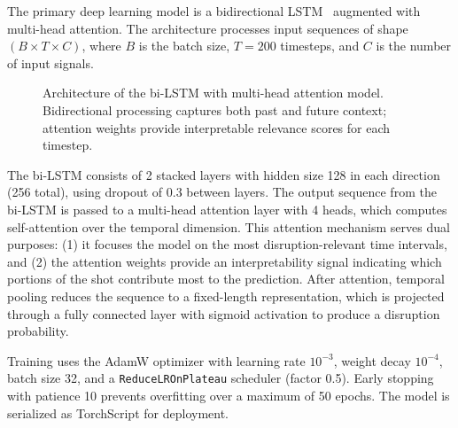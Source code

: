 \documentclass[twocolumn]{article}
\begin{document}
The primary deep learning model is a bidirectional
LSTM~\citep{hochreiter1997} augmented with multi-head
attention.
The architecture processes input sequences of shape
$(B \times T \times C)$, where $B$ is the batch size,
$T = 200$ timesteps, and $C$ is the number of input signals.

\begin{figure}[t]
\centering
{}
\caption{Architecture of the bi-LSTM with multi-head attention
  model. Bidirectional processing captures both past and future
  context; attention weights provide interpretable relevance
  scores for each timestep.}
\label{fig:lstm}
\end{figure}

The bi-LSTM consists of 2 stacked layers with hidden size 128
in each direction (256 total), using dropout of 0.3 between
layers.
The output sequence from the bi-LSTM is passed to a multi-head
attention layer with 4 heads, which computes self-attention
over the temporal dimension.
This attention mechanism serves dual purposes: (1) it focuses
the model on the most disruption-relevant time intervals, and
(2) the attention weights provide an interpretability signal
indicating which portions of the shot contribute most to the
prediction.
After attention, temporal pooling reduces the sequence to a
fixed-length representation, which is projected through a
fully connected layer with sigmoid activation to produce a
disruption probability.

Training uses the AdamW optimizer with learning rate $10^{-3}$,
weight decay $10^{-4}$, batch size 32, and a
\texttt{ReduceLROnPlateau} scheduler (factor 0.5).
Early stopping with patience 10 prevents overfitting over a
maximum of 50 epochs.
The model is serialized as TorchScript for deployment.
\end{document}
